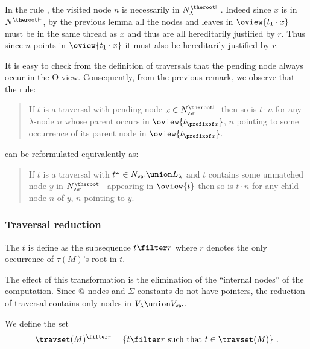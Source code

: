 \begin{remark}
\label{rem:inputvar} In the rule , the visited node $n$ is necessarily in $N_\lambda^{\theroot\vdash}$. Indeed since $x$ is in $N^{\theroot\vdash}$, by
the previous lemma all the nodes and leaves in
$\oview{t_1 \cdot x}$ must be in the same thread as $x$ and thus are all hereditarily justified by $r$. Thus since $n$ points in $\oview{t_1 \cdot x}$ it must also be hereditarily justified by $r$.
\end{remark}
\begin{remark}
\label{rem:inputvar_bis}
It is easy to check from the definition of traversals that the pending node always occur in the O-view. Consequently, from the previous remark, we observe that the rule:
\begin{quote}
 If $t$ is a traversal with pending node  $x \in N_{\sf var}^{\theroot\vdash}$ then so is $t \cdot n$ for any $\lambda$-node $n$ whose parent occurs in  $\oview{t_{\prefixof x}}$, $n$ pointing to some occurrence of its  parent node in $\oview{t_{\prefixof x}}$.
\end{quote}
\noindent can be reformulated equivalently as:
\begin{quote}
 If $t$ is a traversal with
$t^\omega \in N_{\sf var}\union L_\lambda$ and $t$ contains some unmatched node $y$ in $N_{\sf var}^{\theroot\vdash}$ appearing in $\oview{t}$ then so is $t \cdot n$ for any child node $n$ of $y$, $n$ pointing to $y$.
\end{quote}
\end{remark}


\subsubsection{Traversal reduction}

\begin{definition}
The  $t$ is define as the subsequence $t\filter r$ where $r$ denotes the only occurrence of $\tau(M)$'s root in $t$.
\end{definition}
The effect of this transformation is the elimination of the
``internal nodes'' of the computation. Since @-nodes and
$\Sigma$-constants do not have pointers, the reduction of traversal
contains only nodes in $V_\lambda \union V_{\sf var}$.

We define the set
$$\travset(M)^{\filter r} = \{ t  \filter r \mbox{ such that } t  \in \travset(M) \} \ . $$


